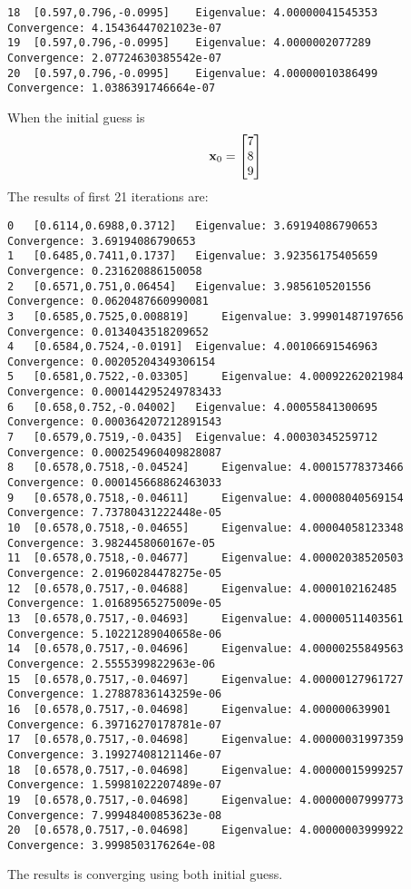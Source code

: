 \documentclass{article}
\begin{document}
\begin{enumerate}
\begin{verbatim}
18	[0.597,0.796,-0.0995]	 Eigenvalue: 4.00000041545353	 Convergence: 4.15436447021023e-07
19	[0.597,0.796,-0.0995]	 Eigenvalue: 4.0000002077289	 Convergence: 2.07724630385542e-07
20	[0.597,0.796,-0.0995]	 Eigenvalue: 4.00000010386499	 Convergence: 1.0386391746664e-07
\end{verbatim}
When the initial guess is 
\begin{align}
\boldsymbol{\mathrm{x}}_0=\begin{bmatrix} 7 \\ 8 \\ 9 \end{bmatrix}
\end{align}
The results of first 21 iterations are: 
\begin{verbatim} 
0	[0.6114,0.6988,0.3712]	 Eigenvalue: 3.69194086790653	 Convergence: 3.69194086790653
1	[0.6485,0.7411,0.1737]	 Eigenvalue: 3.92356175405659	 Convergence: 0.231620886150058
2	[0.6571,0.751,0.06454]	 Eigenvalue: 3.9856105201556	 Convergence: 0.0620487660990081
3	[0.6585,0.7525,0.008819]	 Eigenvalue: 3.99901487197656	 Convergence: 0.0134043518209652
4	[0.6584,0.7524,-0.0191]	 Eigenvalue: 4.00106691546963	 Convergence: 0.00205204349306154
5	[0.6581,0.7522,-0.03305]	 Eigenvalue: 4.00092262021984	 Convergence: 0.000144295249783433
6	[0.658,0.752,-0.04002]	 Eigenvalue: 4.00055841300695	 Convergence: 0.000364207212891543
7	[0.6579,0.7519,-0.0435]	 Eigenvalue: 4.00030345259712	 Convergence: 0.000254960409828087
8	[0.6578,0.7518,-0.04524]	 Eigenvalue: 4.00015778373466	 Convergence: 0.000145668862463033
9	[0.6578,0.7518,-0.04611]	 Eigenvalue: 4.00008040569154	 Convergence: 7.73780431222448e-05
10	[0.6578,0.7518,-0.04655]	 Eigenvalue: 4.00004058123348	 Convergence: 3.9824458060167e-05
11	[0.6578,0.7518,-0.04677]	 Eigenvalue: 4.00002038520503	 Convergence: 2.01960284478275e-05
12	[0.6578,0.7517,-0.04688]	 Eigenvalue: 4.0000102162485	 Convergence: 1.01689565275009e-05
13	[0.6578,0.7517,-0.04693]	 Eigenvalue: 4.00000511403561	 Convergence: 5.10221289040658e-06
14	[0.6578,0.7517,-0.04696]	 Eigenvalue: 4.00000255849563	 Convergence: 2.5555399822963e-06
15	[0.6578,0.7517,-0.04697]	 Eigenvalue: 4.00000127961727	 Convergence: 1.27887836143259e-06
16	[0.6578,0.7517,-0.04698]	 Eigenvalue: 4.000000639901	 Convergence: 6.39716270178781e-07
17	[0.6578,0.7517,-0.04698]	 Eigenvalue: 4.00000031997359	 Convergence: 3.19927408121146e-07
18	[0.6578,0.7517,-0.04698]	 Eigenvalue: 4.00000015999257	 Convergence: 1.59981022207489e-07
19	[0.6578,0.7517,-0.04698]	 Eigenvalue: 4.00000007999773	 Convergence: 7.99948400853623e-08
20	[0.6578,0.7517,-0.04698]	 Eigenvalue: 4.00000003999922	 Convergence: 3.9998503176264e-08
\end{verbatim}
The results is converging using both initial guess. 


\end{enumerate}
\end{document}
